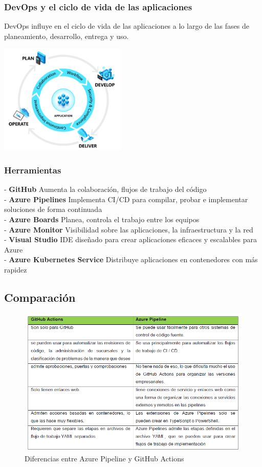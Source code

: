 \documentclass[twoside,twocolumn]{article}
\begin{document}
\subsubsection{DevOps y el ciclo de vida de las aplicaciones}
DevOps influye en el ciclo de vida de las aplicaciones a lo largo de las fases de planeamiento, desarrollo, entrega y uso.

\includegraphics[width = 6cm]{./Imagenes/1.png}

\subsubsection{Herramientas}
- \textbf{GitHub}
Aumenta la colaboración, flujos de trabajo del código\\
- \textbf{Azure Pipelines}
Implementa CI/CD para compilar, probar e implementar soluciones de forma continuada\\
- \textbf{Azure Boards}
Planea, controla el trabajo entre los equipos\\
- \textbf{Azure Monitor}
Visibilidad sobre las aplicaciones, la infraestructura y la red\\
- \textbf{Visual Studio}
IDE diseñado para crear aplicaciones eficaces y escalables para Azure\\
- \textbf{Azure Kubernetes Service}
Distribuye aplicaciones en contenedores con más rapidez

\subsection{Comparación}

\begin{figure}[htb]
\centering
\includegraphics[width=1\textwidth]{./Imagenes/2.png}
\caption{Diferencias entre Azure Pipeline y GitHub Actions}
\label{fig:mont}
\end{figure}
\end{document}
